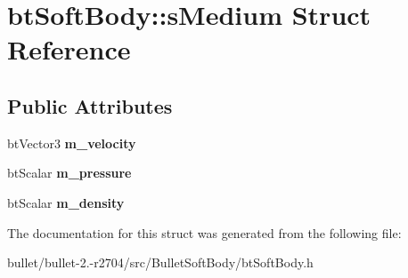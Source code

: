 \hypertarget{structbt_soft_body_1_1s_medium}{\section{bt\+Soft\+Body\+:\+:s\+Medium Struct Reference}
\label{structbt_soft_body_1_1s_medium}
}
\subsection*{Public Attributes}
\begin{DoxyCompactItemize}
\item 
\hypertarget{structbt_soft_body_1_1s_medium_affbc228a8ce2083a0737bf638a0532bb}{bt\+Vector3 {\bfseries m\+\_\+velocity}}\label{structbt_soft_body_1_1s_medium_affbc228a8ce2083a0737bf638a0532bb}

\item 
\hypertarget{structbt_soft_body_1_1s_medium_ae6862f2817ec4fb032f824c6a1c169bd}{bt\+Scalar {\bfseries m\+\_\+pressure}}\label{structbt_soft_body_1_1s_medium_ae6862f2817ec4fb032f824c6a1c169bd}

\item 
\hypertarget{structbt_soft_body_1_1s_medium_a733bce7e2535dc75c72e31f2ed865647}{bt\+Scalar {\bfseries m\+\_\+density}}\label{structbt_soft_body_1_1s_medium_a733bce7e2535dc75c72e31f2ed865647}

\end{DoxyCompactItemize}


The documentation for this struct was generated from the following file\+:\begin{DoxyCompactItemize}
\item 
bullet/bullet-\/2.-\/r2704/src/\+Bullet\+Soft\+Body/bt\+Soft\+Body.\+h\end{DoxyCompactItemize}
